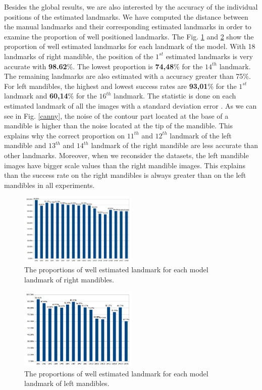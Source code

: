\documentclass[twoside,twocolumn,10pt]{article}
\begin{document}
Besides the global results, we are also interested by the accuracy of the individual positions of the estimated landmarks.
We have computed the distance between the manual landmarks and their corresponding estimated landmarks in order to examine the proportion of well positioned landmarks.
The Fig. \ref{figmdresultlm} and \ref{figmgresultlm} show the proportion of well estimated landmarks for each landmark of the model.
With 18 landmarks of right mandible, the position of the $1^{st}$ estimated landmarks is very accurate with \textbf{98.62}\%.
The lowest proportion is \textbf{74,48}\% for the $14^{th}$ landmark.
The remaining landmarks are also estimated with a accuracy greater than 75\%.
For left mandibles, the highest and lowest success rates are \textbf{93,01}\% for the $1^{st}$ landmark and \textbf{60,14}\% for the $16^{th}$ landmark.
The statistic is done on each estimated landmark of all the images with a standard deviation error \cite{bland1996statistics}.
As we can see in Fig. \ref{canny}, the noise of the contour part located at the base of a mandible is higher than the noise located at the tip of the mandible.
This explains why the correct proportion on $11^{th}$ and $12^{th}$ landmark of the left mandible and $13^{th}$ and $14^{th}$ landmark of the right mandible are less accurate than other landmarks.
Moreover, when we reconsider the datasets, the left mandible images have bigger scale values than the right mandible images.
This explains than the success rate on the right mandibles is always greater than on the left mandibles in all experiments.
\begin{figure}[htb]
    \centering
    \includegraphics[width=0.5\textwidth]{./images/md_chartlms}
    \caption{The proportions of well estimated landmark for each model landmark of right mandibles.}
    \label{figmdresultlm}
\end{figure}
\begin{figure}[htb]
    \centering
    \includegraphics[width=0.5\textwidth]{./images/mg_chartlms}
    \caption{The proportions of well estimated landmark for each model landmark of left mandibles.}
    \label{figmgresultlm}
\end{figure}
\end{document}
